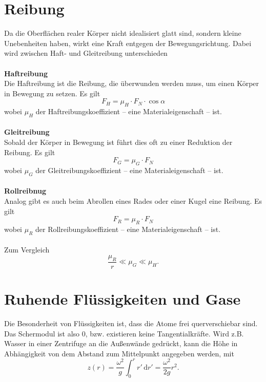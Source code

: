 \documentclass[a4paper,12pt]{article}
\newcommand{\td}{\,\text{d}}
\begin{document}
\section{Reibung}
Da die Oberflächen realer Körper nicht idealisiert glatt sind, sondern kleine Unebenheiten haben, wirkt eine Kraft entgegen der Bewegungsrichtung. Dabei wird zwischen Haft- und Gleitreibung unterschieden
\\\hfill\\\textbf{Haftreibung}\\ 
Die Haftreibung ist die Reibung, die überwunden werden muss, um einen Körper in Bewegung zu setzen. Es gilt
\[ 
        F_H=\mu _H\cdot F_N\cdot \cos \alpha 
\] 
wobei $\mu _H$ der Haftreibungskoeffizient -- eine Materialeigenschaft -- ist.
\\\hfill\\\textbf{Gleitreibung}\\ 
Sobald der Körper in Bewegung ist führt dies oft zu einer Reduktion der Reibung. Es gilt
\[ 
        F_G=\mu _G\cdot F_N
\] 
wobei $\mu _G$ der Gleitreibungskoeffizient -- eine Materialeigenschaft -- ist.
\\\hfill\\\textbf{Rollreibnug}\\ 
Analog gibt es auch beim Abrollen eines Rades oder einer Kugel eine Reibung. Es gilt
\[ 
        F_R=\mu _R\cdot F_N
\] 
wobei $\mu _R$ der Rollreibungskoeffizient -- eine Materialeigenschaft -- ist.\\\\
Zum Vergleich
\[ 
        \dfrac{\mu _R}{r}\ll\mu _G\ll\mu _H
.\] 

\section{Ruhende Flüssigkeiten und Gase}
Die Besonderheit von Flüssigkeiten ist, dass die Atome frei querverschiebar sind. Das Schermodul ist also 0, bzw. existieren keine Tangentialkräfte. Wird z.B. Wasser in einer Zentrifuge an die Außenwände gedrückt, kann die Höhe in Abhängigkeit von dem Abstand zum Mittelpunkt angegeben werden, mit
\[ 
        z\left(r\right)=\dfrac{\omega ^2}{g}\int_{0}^{r}r'\td r'=\dfrac{\omega ^2}{2g}r^2
.\] 
\end{document}
